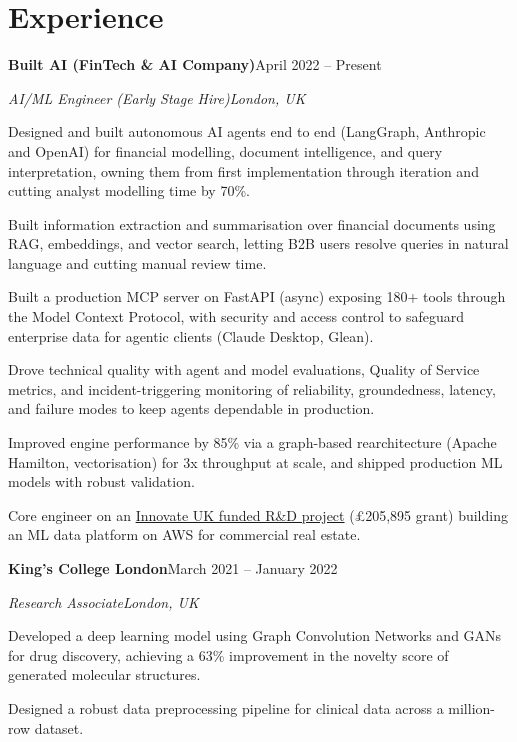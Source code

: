 \documentclass[10pt,a4paper]{article}
\newcommand{\entry}[4]{%
  {\color{company}\bfseries #1}\hfill {\color{muted}#2}\par
  \vspace{1pt}
  {\itshape #3}\hfill {\color{muted}\itshape #4}\par
  \vspace{3pt}%
}
\begin{document}
\section{Experience}
\entry{Built AI (FinTech \& AI Company)}{April 2022 -- Present}{AI/ML Engineer (Early Stage Hire)}{London, UK}
\begin{tight}
  \item Designed and built autonomous AI agents end to end (LangGraph, Anthropic and OpenAI) for financial modelling, document intelligence, and query interpretation, owning them from first implementation through iteration and cutting analyst modelling time by 70\%.
  \item Built information extraction and summarisation over financial documents using RAG, embeddings, and vector search, letting B2B users resolve queries in natural language and cutting manual review time.
  \item Built a production MCP server on FastAPI (async) exposing 180+ tools through the Model Context Protocol, with security and access control to safeguard enterprise data for agentic clients (Claude Desktop, Glean).
  \item Drove technical quality with agent and model evaluations, Quality of Service metrics, and incident-triggering monitoring of reliability, groundedness, latency, and failure modes to keep agents dependable in production.
  \item Improved engine performance by 85\% via a graph-based rearchitecture (Apache Hamilton, vectorisation) for 3x throughput at scale, and shipped production ML models with robust validation.
  \item Core engineer on an \href{https://gtr.ukri.org/projects?ref=10022996}{Innovate UK funded R\&D project} (\pounds205,895 grant) building an ML data platform on AWS for commercial real estate.
\end{tight}

\entry{King's College London}{March 2021 -- January 2022}{Research Associate}{London, UK}
\begin{tight}
  \item Developed a deep learning model using Graph Convolution Networks and GANs for drug discovery, achieving a 63\% improvement in the novelty score of generated molecular structures.
  \item Designed a robust data preprocessing pipeline for clinical data across a million-row dataset.
\end{tight}
\end{document}
